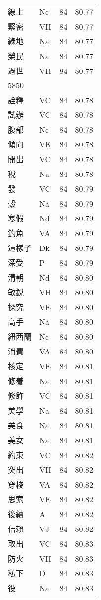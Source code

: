 \documentclass[twocolumn]{book}
\begin{document}
\begin{supertabular}{llrr}
線上 & Nc & 84 &  80.77\\
緊密 & VH & 84 &  80.77\\
綠地 & Na & 84 &  80.77\\
榮民 & Na & 84 &  80.77\\
過世 & VH & 84 &  80.77\\
5850\\
詮釋 & VC & 84 &  80.78\\
試辦 & VC & 84 &  80.78\\
腹部 & Nc & 84 &  80.78\\
傾向 & VK & 84 &  80.78\\
開出 & VC & 84 &  80.78\\
稅 & Na & 84 &  80.78\\
發 & VC & 84 &  80.79\\
殼 & Na & 84 &  80.79\\
寒假 & Nd & 84 &  80.79\\
釣魚 & VA & 84 &  80.79\\
這樣子 & Dk & 84 &  80.79\\
深受 & P & 84 &  80.79\\
清朝 & Nd & 84 &  80.80\\
敏銳 & VH & 84 &  80.80\\
探究 & VE & 84 &  80.80\\
高手 & Na & 84 &  80.80\\
紐西蘭 & Nc & 84 &  80.80\\
消費 & VA & 84 &  80.80\\
核定 & VE & 84 &  80.81\\
修養 & Na & 84 &  80.81\\
修飾 & VC & 84 &  80.81\\
美學 & Na & 84 &  80.81\\
美食 & Na & 84 &  80.81\\
美女 & Na & 84 &  80.81\\
約束 & VC & 84 &  80.82\\
突出 & VH & 84 &  80.82\\
穿梭 & VA & 84 &  80.82\\
思索 & VE & 84 &  80.82\\
後續 & A & 84 &  80.82\\
信賴 & VJ & 84 &  80.82\\
取出 & VC & 84 &  80.83\\
防火 & VH & 84 &  80.83\\
私下 & D & 84 &  80.83\\
役 & Na & 84 &  80.83\\

\end{supertabular}
\end{document}
